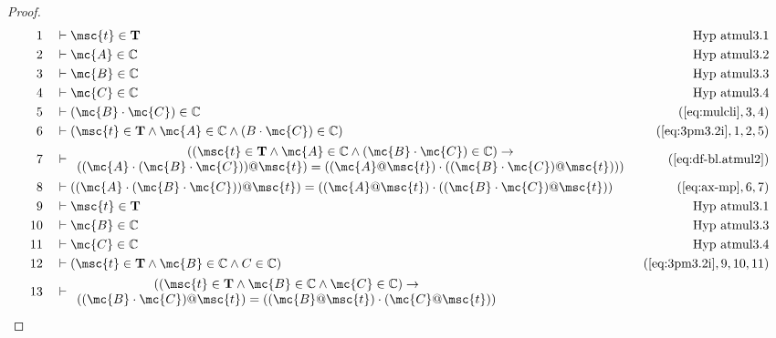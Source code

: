 \begin{proof}
\begin{align}
  1 &&  & \vdash \msc{t} \in \mathbf{T}&\text{Hyp~atmul3.1}\notag%
  \\ 2 &&  & \vdash \mc{A} \in \mathbb{C}&\text{Hyp~atmul3.2}\notag%
  \\ 3 &&  & \vdash \mc{B} \in \mathbb{C}&\text{Hyp~atmul3.3}\notag%
  \\ 4 &&  & \vdash \mc{C} \in \mathbb{C}&\text{Hyp~atmul3.4}\notag%
  \\ 5 &&  & \vdash ( \mc{B} \cdot \mc{C} ) \in
     \mathbb{C}&(\mbox{\ref{eq:mulcli}},3,4)\notag
  \\ 6 &&  & \vdash ( \msc{t} \in \mathbf{T} \wedge \mc{A} \in \mathbb{C} \wedge ( B
     \cdot \mc{C} ) \in \mathbb{C}
     )&(\mbox{\ref{eq:3pm3.2i}},1,2,5)\notag
  \\ 7 &&  & \vdash 
     \begin{array}{c}
     ( ( \msc{t} \in \mathbf{T} \wedge \mc{A} \in \mathbb{C} \wedge (
     \mc{B} \cdot \mc{C} ) \in \mathbb{C} ) \rightarrow \notag \\
     ( ( \mc{A} \cdot
     ( \mc{B} \cdot \mc{C} ) ) @ \msc{t} ) = ( ( \mc{A} @ \msc{t} ) \cdot
     ( ( \mc{B} \cdot \mc{C} ) @ \msc{t} ) )
     )
     \end{array}
     &(\mbox{\ref{eq:df-bl.atmul2}})\notag
  \\ 8 &&  & \vdash ( ( \mc{A} \cdot ( \mc{B} \cdot \mc{C} ) ) @ \msc{t} ) = ( ( \mc{A} @ \msc{t} )
     \cdot ( ( \mc{B} \cdot \mc{C} ) @ \msc{t} )
     )&(\mbox{\ref{eq:ax-mp}},6,7)\notag
  \\ 9 &&  & \vdash \msc{t} \in
     \mathbf{T}&\text{Hyp~atmul3.1}\notag%
  \\ 10 &&  & \vdash \mc{B} \in \mathbb{C}&\text{Hyp~atmul3.3}\notag%
  \\ 11 &&  & \vdash \mc{C} \in \mathbb{C}&\text{Hyp~atmul3.4}\notag%
  \\ 12 &&  & \vdash ( \msc{t} \in \mathbf{T} \wedge \mc{B} \in \mathbb{C} \wedge C
     \in \mathbb{C}
     )&(\mbox{\ref{eq:3pm3.2i}},9,10,11)\notag
  \\ 13 &&  & \vdash 
     \begin{array}{c}
     ( ( \msc{t} \in \mathbf{T} \wedge \mc{B} \in \mathbb{C} \wedge
     \mc{C} \in \mathbb{C} ) \rightarrow \\
     ( ( \mc{B} \cdot \mc{C} ) @
     \msc{t} ) = ( ( \mc{B} @ \msc{t} ) \cdot ( \mc{C} @ \msc{t} ) )

\end{array}
\end{align}
\end{proof}

